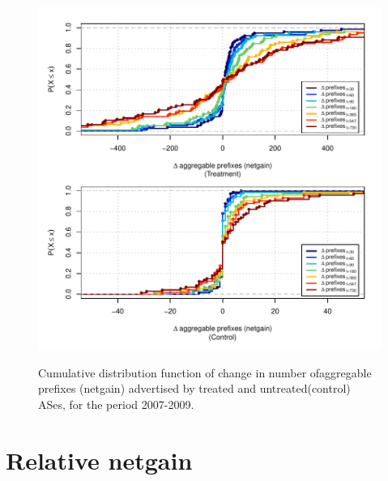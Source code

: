 \clearpage
\vspace*{1.25em}
\begin{figure}[H]
\begin{centering}
\begin{singlespace}
\captionsetup{list=no}
    \includegraphics[width=6in]{figures/behavior-netgain-2007_2009-corr.pdf}
    \vspace{-2em}\\
    \caption{Cumulative distribution function of change in number ofaggregable
    prefixes (netgain) advertised by treated and untreated(control) ASes, for
    the period 2007-2009.}
\end{singlespace}
\end{centering}
\end{figure}


\clearpage
\section{Relative netgain}


